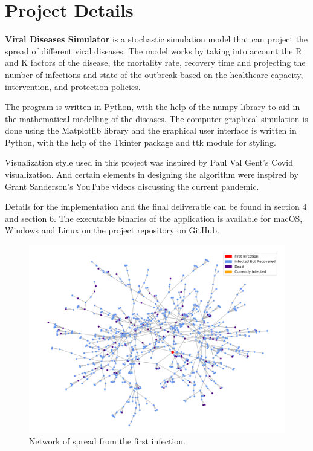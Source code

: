 \documentclass[11pt]{article}
\begin{document}
\section{Project Details}

\textbf{Viral Diseases Simulator} is a stochastic simulation model that can project the spread of different viral diseases. The model works by taking into account the R and K factors of the disease, the mortality rate, recovery time and projecting the number of infections and state of the outbreak based on the healthcare capacity, intervention, and protection policies. 

The program is written in Python, with the help of the numpy library to aid in the mathematical modelling of the diseases. The computer graphical simulation is done using the Matplotlib library and the graphical user interface is written in Python, with the help of the Tkinter package and ttk module for styling. 

Visualization style used in this project was inspired by Paul Val Gent's Covid visualization\cite{sim_ref}. And certain elements in designing the algorithm were inspired by Grant Sanderson's YouTube videos discussing the current pandemic\cite{yt1}\cite{yt2}.

Details for the implementation and the final deliverable can be found in section 4 and section 6. The executable binaries of the application is available for macOS, Windows and Linux on the project repository on GitHub. 

\begin{figure}[H]
\caption{Network of spread from the first infection.}\label{wrap-fig:1}
\includegraphics[width=14cm]{figures/infected network.png}
\end{figure} 
\end{document}
